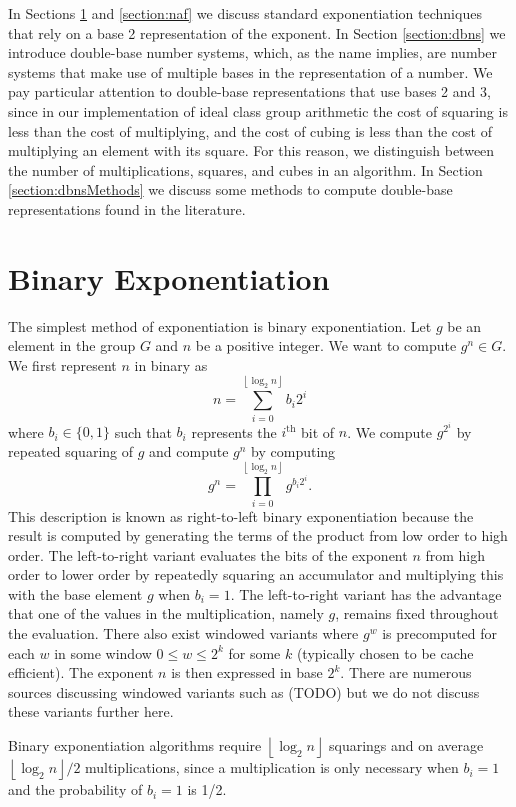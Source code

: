 \documentclass{ucalgthes1}
\theoremstyle{plain}
\theoremstyle{definition}
\newcommand{\floor}[1]{\left\lfloor #1 \right\rfloor}
\begin{document}
In Sections \ref{section:binary} and \ref{section:naf} we discuss standard exponentiation techniques that rely on a base 2 representation of the exponent.  In Section \ref{section:dbns} we introduce double-base number systems, which, as the name implies, are number systems that make use of multiple bases in the representation of a number.  We pay particular attention to double-base representations that use bases 2 and 3, since in our implementation of ideal class group arithmetic the cost of squaring is less than the cost of multiplying, and the cost of cubing is less than the cost of multiplying an element with its square. For this reason, we distinguish between the number of multiplications, squares, and cubes in an algorithm. In Section \ref{section:dbnsMethods} we discuss some methods to compute double-base representations found in the literature.  


\bigbreak
\section{Binary Exponentiation}\label{section:binary}
The simplest method of exponentiation is binary exponentiation.  Let $g$ be an element in the group $G$ and $n$ be a positive integer.  We want to compute $g^n \in G$.  We first represent $n$ in binary as
\[
	n = \sum_{i=0}^{\floor{\log_2 n}} b_i 2^i
\]
where $b_i \in \{0, 1\}$ such that $b_i$ represents the $i^{\textrm{th}}$ bit of $n$.   We compute $g^{2^i}$ by repeated squaring of $g$ and compute $g^n$ by computing
\[
	g^n = \prod_{i=0}^{\floor{\log_2 n}} g^{b_i 2^i}.
\]
This description is known as right-to-left binary exponentiation because the result is computed by generating the terms of the product from low order to high order.  The left-to-right variant evaluates the bits of the exponent $n$ from high order to lower order by repeatedly squaring an accumulator and multiplying this with the base element $g$ when $b_i = 1$.  The left-to-right variant has the advantage that one of the values in the multiplication, namely $g$, remains fixed throughout the evaluation.  There also exist windowed variants where $g^w$ is precomputed for each $w$ in some window $0 \le w \le 2^k$ for some $k$ (typically chosen to be cache efficient). The exponent $n$ is then expressed in base $2^k$.  There are numerous sources discussing windowed variants such as (TODO) but we do not discuss these variants further here.

Binary exponentiation algorithms require $\floor{\log_2 n}$ squarings and on average $\floor{\log_2 n}/2$ multiplications, since a multiplication is only necessary when $b_i = 1$ and the probability of $b_i = 1$ is 1/2.
\end{document}
